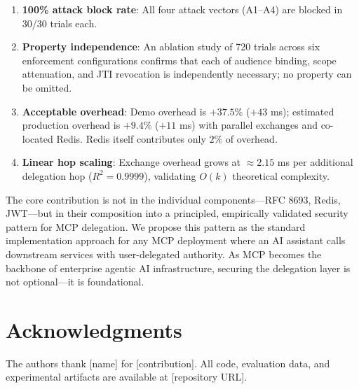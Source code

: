 \documentclass[journal]{IEEEtran}
\begin{document}
\begin{enumerate}
  \item \textbf{100\% attack block rate}: All four attack vectors (A1--A4) are blocked in 30/30 trials each.
  \item \textbf{Property independence}: An ablation study of 720 trials across six enforcement configurations confirms that each of audience binding, scope attenuation, and JTI revocation is independently necessary; no property can be omitted.
  \item \textbf{Acceptable overhead}: Demo overhead is $+37.5\%$ ($+43$ ms); estimated production overhead is $+9.4\%$ ($+11$ ms) with parallel exchanges and co-located Redis. Redis itself contributes only $2\%$ of overhead.
  \item \textbf{Linear hop scaling}: Exchange overhead grows at $\approx 2.15$ ms per additional delegation hop ($R^2 = 0.9999$), validating $O(k)$ theoretical complexity.
\end{enumerate}

The core contribution is not in the individual components—RFC 8693, Redis, JWT—but in their composition into a principled, empirically validated security pattern for MCP delegation. We propose this pattern as the standard implementation approach for any MCP deployment where an AI assistant calls downstream services with user-delegated authority. As MCP becomes the backbone of enterprise agentic AI infrastructure, securing the delegation layer is not optional—it is foundational.


\section*{Acknowledgments}
The authors thank [name] for [contribution]. All code, evaluation data, and experimental artifacts are available at [repository URL].
\end{document}
